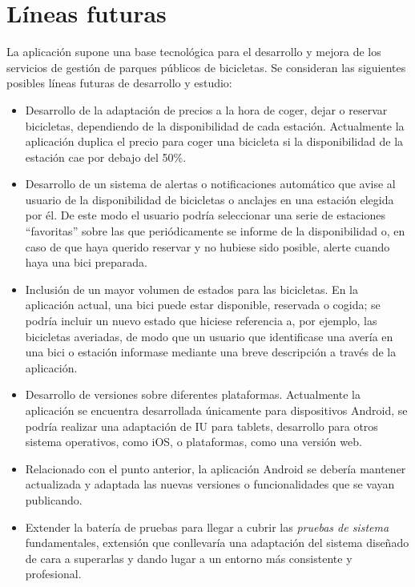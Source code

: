 \section{Líneas futuras}

La aplicación supone una base tecnológica para el desarrollo y mejora de los servicios de gestión de parques públicos de bicicletas. Se consideran las siguientes posibles líneas futuras de desarrollo y estudio:

\begin{itemize}  
	\item Desarrollo de la adaptación de precios a la hora de coger, dejar o reservar bicicletas, dependiendo de la disponibilidad de cada estación. Actualmente la aplicación duplica el precio para coger una bicicleta si la disponibilidad de la estación cae por debajo del 50\%.
	\item Desarrollo de un sistema de alertas o notificaciones automático que avise al usuario de la disponibilidad de bicicletas o anclajes en una estación elegida por él. De este modo el usuario podría seleccionar una serie de estaciones ``favoritas'' sobre las que periódicamente se informe de la disponibilidad o, en caso de que haya querido reservar y no hubiese sido posible, alerte cuando haya una bici preparada.
	\item Inclusión de un mayor volumen de estados para las bicicletas. En la aplicación actual, una bici puede estar disponible, reservada o cogida; se podría incluir un nuevo estado que hiciese referencia a, por ejemplo, las bicicletas averiadas, de modo que un usuario que identificase una avería en una bici o estación informase mediante una breve descripción a través de la aplicación.
	\item Desarrollo de versiones sobre diferentes plataformas. Actualmente la aplicación se encuentra desarrollada únicamente para dispositivos Android, se podría realizar una adaptación de IU para tablets, desarrollo para otros sistema operativos, como iOS, o plataformas, como una versión web.
	\item Relacionado con el punto anterior, la aplicación Android se debería mantener actualizada y adaptada las nuevas versiones o funcionalidades que se vayan publicando.
	\item Extender la batería de pruebas para llegar a cubrir las \emph{pruebas de sistema} fundamentales, extensión que conllevaría una adaptación del sistema diseñado de cara a superarlas y dando lugar a un entorno más consistente y profesional.
\end{itemize}